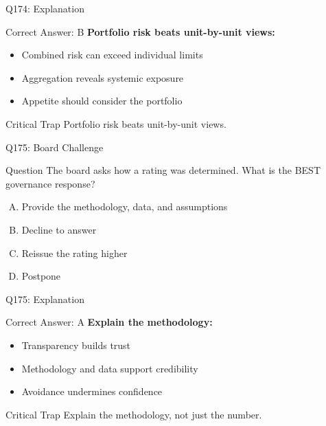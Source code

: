 \documentclass{beamer}
\begin{document}
	\begin{frame}{Q174: Explanation}
		\begin{block}{Correct Answer: B}
			\textbf{Portfolio risk beats unit-by-unit views:}
			\begin{itemize}
				\item Combined risk can exceed individual limits
				\item Aggregation reveals systemic exposure
				\item Appetite should consider the portfolio
			\end{itemize}
		\end{block}
		\begin{alertblock}{Critical Trap}
			Portfolio risk beats unit-by-unit views.
		\end{alertblock}
	\end{frame}
	
	\begin{frame}{Q175: Board Challenge}
		\begin{block}{Question}
			The board asks how a rating was determined. What is the BEST governance response?
		\end{block}
		\begin{enumerate}[(A)]
			\item Provide the methodology, data, and assumptions
			\item Decline to answer
			\item Reissue the rating higher
			\item Postpone
		\end{enumerate}
	\end{frame}
	
	\begin{frame}{Q175: Explanation}
		\begin{block}{Correct Answer: A}
			\textbf{Explain the methodology:}
			\begin{itemize}
				\item Transparency builds trust
				\item Methodology and data support credibility
				\item Avoidance undermines confidence
			\end{itemize}
		\end{block}
		\begin{alertblock}{Critical Trap}
			Explain the methodology, not just the number.
		\end{alertblock}
	\end{frame}
	
\end{document}
